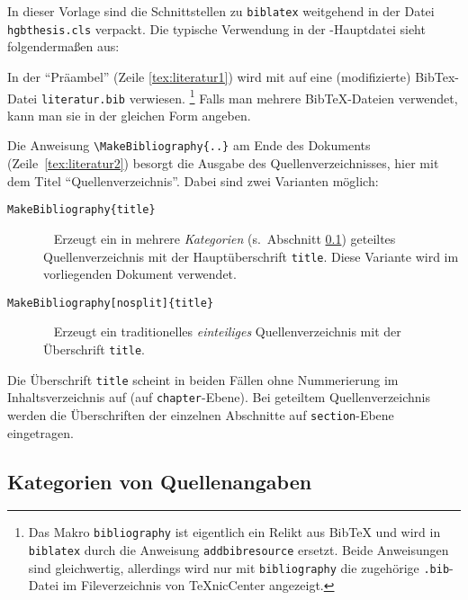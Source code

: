 In dieser Vorlage sind die Schnittstellen zu \texttt{biblatex} weitgehend in der Datei \nolinkurl{hgbthesis.cls} verpackt. Die typische Verwendung in der \latex-Haupt\-datei sieht folgendermaßen aus:
%
%
In der "`Präambel"' (Zeile \ref{tex:literatur1}) wird mit \verb!! 
auf eine (modifizierte) BibTex-Datei \nolinkurl{literatur.bib} verwiesen.%
\footnote{Das Makro 
\texttt{{\bs}bibliography} ist eigentlich ein Relikt aus BibTeX
und wird in \texttt{biblatex} durch die Anweisung \texttt{{\bs}addbibresource} 
ersetzt. Beide Anweisungen sind gleichwertig, allerdings wird nur mit 
\texttt{{\bs}bibliography} die zugehörige \texttt{.bib}-Datei im Fileverzeichnis von TeXnicCenter angezeigt.}
Falls man mehrere BibTeX-Dateien verwendet, kann man sie in der gleichen Form angeben.

Die Anweisung \verb!! am Ende des Dokuments (Zeile~\ref{tex:literatur2})
besorgt die Ausgabe des Quellenverzeichnisses, hier mit dem Titel "`Quellenverzeichnis"'.
Dabei sind zwei Varianten möglich:
%
\begin{description}
\item[\texttt{{\bs}MakeBibliography\{title\}}] ~ \newline
   Erzeugt ein in mehrere \emph{Kategorien} (s.\ Abschnitt \ref{sec:BibKategorien}) geteiltes Quellenverzeichnis 
   mit der Hauptüberschrift \texttt{title}. Diese Variante wird im vorliegenden Dokument verwendet.
\item[\texttt{{\bs}MakeBibliography[nosplit]\{title\}}] ~ \newline
   Erzeugt ein traditionelles \emph{einteiliges} Quellenverzeichnis mit der
   Überschrift \texttt{title}. 
\end{description}
%
Die Überschrift \texttt{title} scheint in beiden Fällen ohne Nummerierung 
im Inhaltsverzeichnis auf (auf \texttt{chapter}-Ebene).
Bei geteiltem Quellenverzeichnis werden die Überschriften der einzelnen Abschnitte auf 
\texttt{section}-Ebene eingetragen.


\subsection{Kategorien von Quellenangaben}
\label{sec:BibKategorien}

